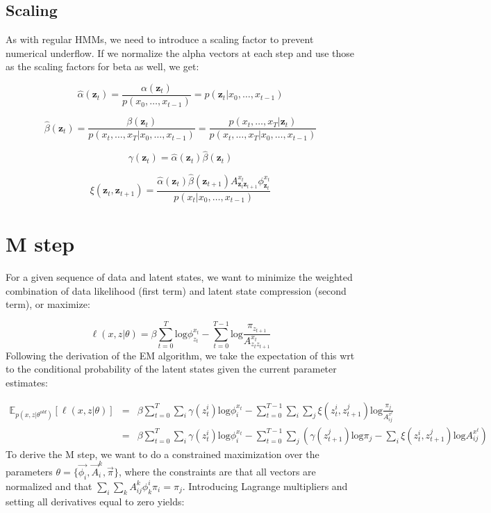 \documentclass[11pt]{article}
\begin{document}
\subsection{Scaling}

As with regular HMMs, we need to introduce a scaling factor to prevent numerical underflow.  If we normalize the alpha vectors at each step and use those as the scaling factors for beta as well, we get:

\[
\hat{\alpha}(\mathbf{z}_t) = \frac{\alpha(\mathbf{z}_t)}{p(x_0,\ldots,x_{t-1})} = p(\mathbf{z}_t|x_0,\ldots,x_{t-1})
\]

\[
\hat{\beta}(\mathbf{z}_t) = \frac{\beta(\mathbf{z}_t)}{p(x_t,\ldots,x_T|x_0,\ldots,x_{t-1})} = \frac{p(x_t,\ldots,x_T|\mathbf{z}_t)}{p(x_t,\ldots,x_T|x_0,\ldots,x_{t-1})}
\]

\[
\gamma(\mathbf{z}_t) = \hat{\alpha}(\mathbf{z}_t)\hat{\beta}(\mathbf{z}_t)
\]

\[
\xi(\mathbf{z}_t,\mathbf{z}_{t+1}) = \frac{\hat{\alpha}(\mathbf{z}_t)\hat{\beta}(\mathbf{z}_{t+1})A^{x_t}_{\mathbf{z}_t\mathbf{z}_{t+1}}\phi^{x_t}_{\mathbf{z}_t}}{p(x_t|x_0,\ldots,x_{t-1})}
\]

\section{M step}

For a given sequence of data and latent states, we want to minimize the weighted combination of data likelihood (first term) and latent state compression (second term), or maximize:

\[
\ell(x,z|\theta) = \beta \sum_{t=0}^T \mathrm{log}\phi^{x_t}_{z_t} - \sum_{t=0}^{T-1} \mathrm{log}\frac{\pi_{z_{t+1}}}{A^{x_t}_{z_t z_{t+1}}}
\]
Following the derivation of the EM algorithm, we take the expectation of this wrt to the conditional probability of the latent states given the current parameter estimates:

\begin{eqnarray}
\mathbb{E}_{p(x,z|\theta^{old})}[\ell(x,z|\theta)] & = & \beta\sum_{t=0}^T\sum_i \gamma(z_t^i) \mathrm{log}\phi_{i}^{x_t} - \sum_{t=0}^{T-1}\sum_i\sum_j \xi(z_{t}^i,z_{t+1}^j)\mathrm{log}\frac{\pi_j}{A^{x^t}_{ij}} \\
& = & \beta\sum_{t=0}^T\sum_i \gamma(z_t^i) \mathrm{log}\phi_{i}^{x_t} - \sum_{t=0}^{T-1}\sum_j \left(\gamma(z_{t+1}^j)\mathrm{log}\pi_j - \sum_i \xi(z_{t}^i,z_{t+1}^j)\mathrm{log}A^{x^t}_{ij}\right) \nonumber
\end{eqnarray}
To derive the M step, we want to do a constrained maximization over the parameters $\theta = \{\vec{\phi_i},\vec{A}^k_i,\vec{\pi}\}$, where the constraints are that all vectors are normalized and that $\sum_i\sum_k A^k_{ij} \phi^i_k\pi_i = \pi_j$.  Introducing Lagrange multipliers and setting all derivatives equal to zero yields:
\end{document}
